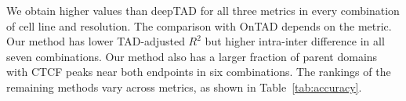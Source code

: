 We obtain higher values than deepTAD for all three metrics in every combination of cell line and resolution.
The comparison with OnTAD depends on the metric.
Our method has lower TAD-adjusted $R^2$ but higher intra-inter difference in all seven combinations.
Our method also has a larger fraction of parent domains with CTCF peaks near both endpoints in six combinations.
The rankings of the remaining methods vary across metrics, as shown in Table~\ref{tab:accuracy}.
